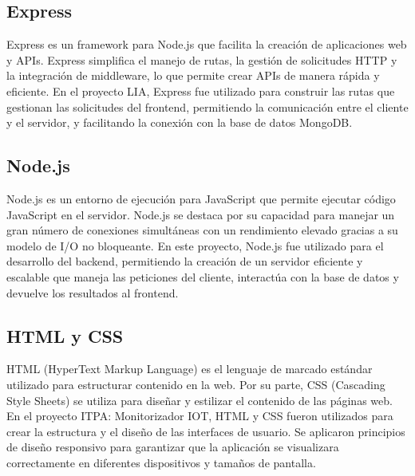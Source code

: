 \subsection{Express}
Express es un framework para Node.js que facilita la creación de aplicaciones web y APIs. Express simplifica el manejo de rutas, la gestión de solicitudes HTTP y la integración de middleware, lo que permite crear APIs de manera rápida y eficiente. En el proyecto LIA, Express fue utilizado para construir las rutas que gestionan las solicitudes del frontend, permitiendo la comunicación entre el cliente y el servidor, y facilitando la conexión con la base de datos MongoDB.

\subsection{Node.js}
Node.js es un entorno de ejecución para JavaScript que permite ejecutar código JavaScript en el servidor. Node.js se destaca por su capacidad para manejar un gran número de conexiones simultáneas con un rendimiento elevado gracias a su modelo de I/O no bloqueante. En este proyecto, Node.js fue utilizado para el desarrollo del backend, permitiendo la creación de un servidor eficiente y escalable que maneja las peticiones del cliente, interactúa con la base de datos y devuelve los resultados al frontend.

\subsection{HTML y CSS}
HTML (HyperText Markup Language) es el lenguaje de marcado estándar utilizado para estructurar contenido en la web. Por su parte, CSS (Cascading Style Sheets) se utiliza para diseñar y estilizar el contenido de las páginas web. En el proyecto ITPA: Monitorizador IOT, HTML y CSS fueron utilizados para crear la estructura y el diseño de las interfaces de usuario. Se aplicaron principios de diseño responsivo para garantizar que la aplicación se visualizara correctamente en diferentes dispositivos y tamaños de pantalla.

